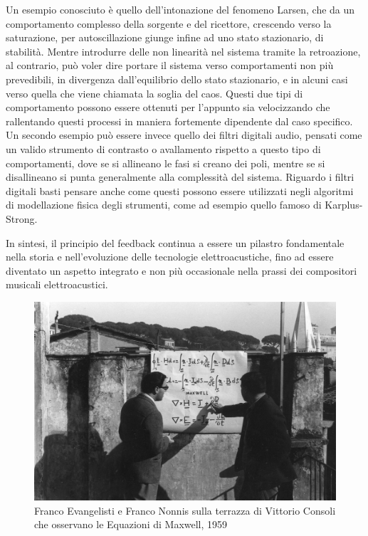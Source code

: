 Un esempio conosciuto è quello dell'intonazione del fenomeno Larsen,
che da un comportamento complesso della sorgente e del ricettore, crescendo
verso la saturazione, per autoscillazione giunge infine ad uno stato stazionario, di stabilità.
Mentre introdurre delle non linearità nel sistema tramite la retroazione,
al contrario, può voler dire portare il sistema verso comportamenti non più prevedibili,
in divergenza dall'equilibrio dello stato stazionario,
e in alcuni casi verso quella che viene chiamata la soglia del caos.
Questi due tipi di comportamento possono essere ottenuti per l'appunto
sia velocizzando che rallentando questi processi
in maniera fortemente dipendente dal caso specifico.
Un secondo esempio può essere invece quello dei filtri digitali audio,
pensati come un valido strumento
di contrasto o avallamento rispetto a questo tipo di comportamenti,
dove se si allineano le fasi si creano dei poli,
mentre se si disallineano si punta generalmente alla complessità del sistema.
Riguardo i filtri digitali basti pensare anche come questi possono essere utilizzati 
negli algoritmi di modellazione fisica
degli strumenti, come ad esempio quello famoso di Karplus-Strong.

In sintesi, il principio del feedback continua a essere un pilastro fondamentale nella storia 
e nell'evoluzione delle tecnologie elettroacustiche, 
fino ad essere diventato un aspetto integrato e non più occasionale 
nella prassi dei compositori musicali elettroacustici.

\begin{figure}[h!]
    \begin{center}
        \vspace{0.5cm}
        \includegraphics[width=12cm]{figures/EvangelistiNonnis.jpg}
        \caption{Franco Evangelisti e Franco Nonnis sulla terrazza di Vittorio Consoli 
        che osservano le Equazioni di Maxwell, 1959}
        \vspace{0.5cm}
        \end{center}
\end{figure} 